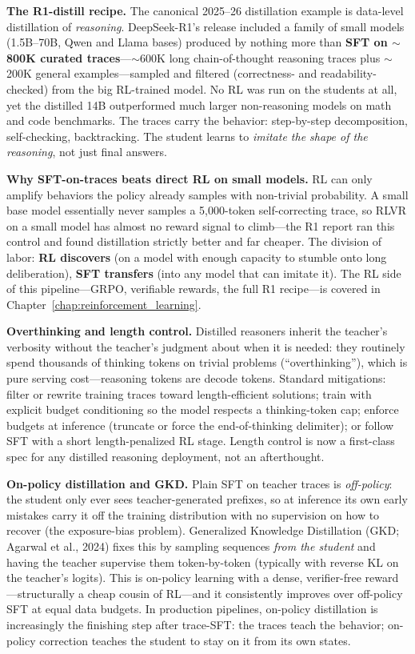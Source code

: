 \textbf{The R1-distill recipe.} The canonical 2025--26 distillation example is data-level distillation of \textit{reasoning}. DeepSeek-R1's release included a family of small models (1.5B--70B, Qwen and Llama bases) produced by nothing more than \textbf{SFT on $\sim$800K curated traces}---$\sim$600K long chain-of-thought reasoning traces plus $\sim$200K general examples---sampled and filtered (correctness- and readability-checked) from the big RL-trained model. No RL was run on the students at all, yet the distilled 14B outperformed much larger non-reasoning models on math and code benchmarks. The traces carry the behavior: step-by-step decomposition, self-checking, backtracking. The student learns to \textit{imitate the shape of the reasoning}, not just final answers.

\textbf{Why SFT-on-traces beats direct RL on small models.} RL can only amplify behaviors the policy already samples with non-trivial probability. A small base model essentially never samples a 5{,}000-token self-correcting trace, so RLVR on a small model has almost no reward signal to climb---the R1 report ran this control and found distillation strictly better and far cheaper. The division of labor: \textbf{RL discovers} (on a model with enough capacity to stumble onto long deliberation), \textbf{SFT transfers} (into any model that can imitate it). The RL side of this pipeline---GRPO, verifiable rewards, the full R1 recipe---is covered in Chapter~\ref{chap:reinforcement_learning}.

\textbf{Overthinking and length control.} Distilled reasoners inherit the teacher's verbosity without the teacher's judgment about when it is needed: they routinely spend thousands of thinking tokens on trivial problems (``overthinking''), which is pure serving cost---reasoning tokens are decode tokens. Standard mitigations: filter or rewrite training traces toward length-efficient solutions; train with explicit budget conditioning so the model respects a thinking-token cap; enforce budgets at inference (truncate or force the end-of-thinking delimiter); or follow SFT with a short length-penalized RL stage. Length control is now a first-class spec for any distilled reasoning deployment, not an afterthought.

\textbf{On-policy distillation and GKD.} Plain SFT on teacher traces is \textit{off-policy}: the student only ever sees teacher-generated prefixes, so at inference its own early mistakes carry it off the training distribution with no supervision on how to recover (the exposure-bias problem). Generalized Knowledge Distillation (GKD; Agarwal et al., 2024) fixes this by sampling sequences \textit{from the student} and having the teacher supervise them token-by-token (typically with reverse KL on the teacher's logits). This is on-policy learning with a dense, verifier-free reward---structurally a cheap cousin of RL---and it consistently improves over off-policy SFT at equal data budgets. In production pipelines, on-policy distillation is increasingly the finishing step after trace-SFT: the traces teach the behavior; on-policy correction teaches the student to stay on it from its own states.

